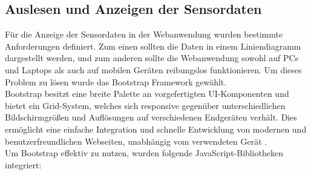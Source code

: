 \documentclass[conference]{IEEEtran}
\begin{document}
\subsection{Auslesen und Anzeigen der Sensordaten}
\label{sec:sensordaten-auslesen}
Für die Anzeige der Sensordaten in der Webanwendung wurden bestimmte Anforderungen definiert. Zum einen sollten die Daten in einem Liniendiagramm dargestellt werden, und zum anderen sollte die Webanwendung sowohl auf PCs und Laptops als auch auf mobilen Geräten reibungslos funktionieren. Um dieses Problem zu lösen wurde das Bootstrap Framework gewählt.\\
Bootstrap besitzt eine breite Palette an vorgefertigten UI-Komponenten und bietet ein Grid-System, welches sich responsive gegenüber unterschiedlichen Bildschirmgrößen und Auflösungen auf verschiedenen Endgeräten verhält. Dies ermöglicht eine einfache Integration und schnelle Entwicklung von modernen und benutzerfreundlichen Webseiten, unabhängig vom verwendeten Gerät \cite{bootstrap}. \\
Um Bootstrap effektiv zu nutzen, wurden folgende JavaScript-Bibliotheken integriert: 
\newpage
\end{document}
